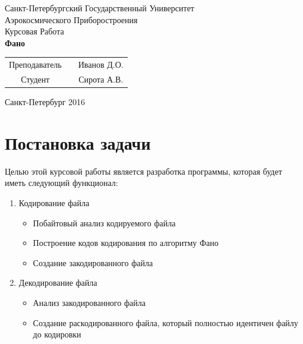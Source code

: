 \documentclass{article}
\begin{document}
\begin{center}
  \Large{Санкт-Петербургский Государственный Университет\\
  Аэрокосмического Приборостроения}\\
  \vspace{9cm}
  \LARGE{Курсовая Работа}\\
  \vspace{1cm}
  \textbf{ Фано}\\
  \vspace{5cm}
\end{center}


\vspace{1em}
\begin{tabular}{ccc}
  Преподаватель & \hspace{8cm} & Иванов Д.О.\\
  Студент & \hspace{9.5cm} & Сирота А.В. 
\end{tabular}

\vspace{1em}

\vfill
\begin{center}
Санкт-Петербург 2016
\end{center}

\newpage

\pagestyle{plain}
\tableofcontents 

\newpage
\section {Постановка задачи}


Целью этой курсовой работы является разработка программы, которая будет иметь следующий функционал:

\begin{enumerate}
  \item Кодирование файла
  
  \begin{itemize}
    \item Побайтовый анализ кодируемого файла
    \item Построение кодов кодирования по алгоритму Фано
    \item Создание закодированного файла
  \end{itemize}
  
  \item Декодирование файла
  
  \begin{itemize}
    \item Анализ закодированного файла
    \item Создание раскодированного файла, который полностью идентичен файлу до кодировки
  \end{itemize}
\end{enumerate}
\end{document}
